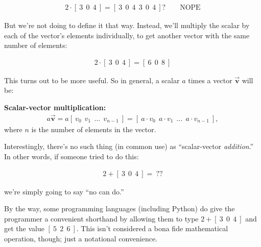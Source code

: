 \vspace{-.15in}
\begin{align*}
2 \cdot [\ 3\ \ 0\ \ 4\ ] = [\ 3\ \ 0\ \ 4\ \ 3\ \ 0\ \ 4\ ] ? \quad  \quad
\textrm{NOPE}
\end{align*}
\vspace{-.15in}

But we're not doing to define it that way. Instead, we'll multiply the scalar
by each of the vector's elements individually, to get another vector with the
same number of elements:

\vspace{-.15in}
\begin{align*}
2 \cdot [\ 3\ \ 0\ \ 4\ ] = [\ 6\ \ 0\ \ 8\ ]
\end{align*}
\vspace{-.15in}


This turns out to be more useful. So in general, a scalar $a$ times a vector
$\overrightarrow{\textbf{v}}$ will be:

\vspace{-.15in}
\begin{center}
\begin{framed}
\textbf{Scalar-vector multiplication:}
\begin{align*}
a \overrightarrow{\textbf{v}} = a [\ v_0\ \ v_1\ \ \dots \ \ v_{n-1}\ ] =
[\ a \cdot v_0\ \ a \cdot v_1\ \ \dots \ \ a \cdot v_{n-1}\ ],
\end{align*}
where $n$ is the number of elements in the vector.
\end{framed}
\end{center}
\vspace{-.15in}

Interestingly, there's no such thing (in common use) as ``scalar-vector
\textit{addition}.'' In other words, if someone tried to do this:

\vspace{-.15in}
\begin{align*}
2 + [\ 3\ \ 0\ \ 4\ ] = \ ??
\end{align*}
\vspace{-.15in}

we're simply going to say ``no can do.''

By the way, some programming languages (including Python) do give the
programmer a convenient shorthand by allowing them to type
$2 + [\ 3\ \ 0\ \ 4\ ]$ and get the value $[\ 5\ \ 2\ \ 6\ ]$. This isn't
considered a bona fide mathematical operation, though; just a notational
convenience.

